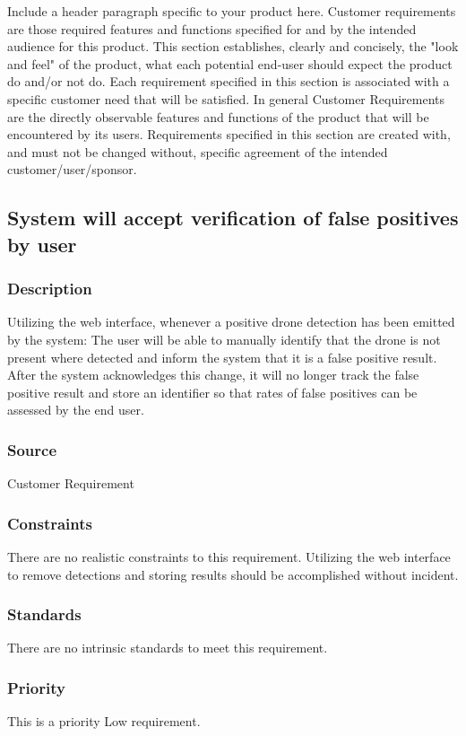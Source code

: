Include a header paragraph specific to your product here. Customer requirements are those required features and functions specified for and by the intended audience for this product. This section establishes, clearly and concisely, the "look and feel" of the product, what each potential end-user should expect the product do and/or not do. Each requirement specified in this section is associated with a specific customer need that will be satisfied. In general Customer Requirements are the directly observable features and functions of the product that will be encountered by its users. Requirements specified in this section are created with, and must not be changed without, specific agreement of the intended customer/user/sponsor.

\subsection{System will accept verification of false positives by user}
\subsubsection{Description}
Utilizing the web interface, whenever a positive drone detection has been emitted by the system: The user will be able to manually identify that the drone is not present where detected and inform the system that it is a false positive result. After the system acknowledges this change, it will no longer track the false positive result and store an identifier so that rates of false positives can be assessed by the end user.
\subsubsection{Source}
Customer Requirement
\subsubsection{Constraints}
There are no realistic constraints to this requirement. Utilizing the web interface to remove detections and storing results should be accomplished without incident.
\subsubsection{Standards}
There are no intrinsic standards to meet this requirement.
\subsubsection{Priority}
This is a priority Low requirement.

